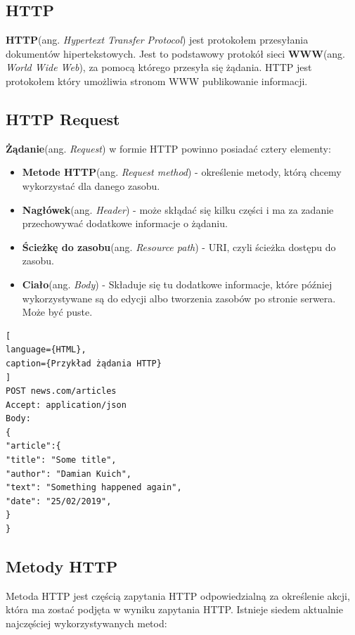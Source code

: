 \documentclass[oneside,polski,logo,indent]{amuthesis}
\begin{document}
\begin{center}
\subsection{HTTP}
\end{center}

\textbf{HTTP}(ang. \emph{Hypertext Transfer Protocol}) jest protokołem przesyłania dokumentów hipertekstowych. Jest to podstawowy protokół sieci \textbf{WWW}(ang. \emph{World Wide Web}), za pomocą którego przesyła się żądania. HTTP jest protokołem który umożliwia stronom WWW publikowanie informacji.

\begin{center}
\subsection{HTTP Request}
\end{center}
\textbf{Żądanie}(ang. \emph{Request}) w formie HTTP powinno posiadać cztery elementy:
\begin{itemize}
\item \textbf{Metode HTTP}(ang. \emph{Request method}) - określenie metody, którą chcemy wykorzystać dla danego zasobu.
\item \textbf{Nagłówek}(ang. \emph{Header}) - może skłądać się kilku części i ma za zadanie przechowywać dodatkowe informacje o żądaniu.
\item \textbf{Ścieżkę do zasobu}(ang. \emph{Resource path}) - URI, czyli ścieżka dostępu do zasobu.
\item \textbf{Ciało}(ang. \emph{Body}) - Składuje się tu dodatkowe informacje, które później wykorzystywane są do edycji albo tworzenia zasobów po stronie serwera. Może być puste.
\end{itemize}


\begin{lstlisting}[
language={HTML},
caption={Przykład żądania HTTP}
]
POST news.com/articles
Accept: application/json
Body:
{
"article":{
"title": "Some title",
"author": "Damian Kuich",
"text": "Something happened again",
"date": "25/02/2019",
}
}
\end{lstlisting}

\begin{center}
\subsection{Metody HTTP}
\end{center}
Metoda HTTP jest częścią zapytania HTTP odpowiedzialną za określenie akcji, która ma zostać podjęta w wyniku zapytania HTTP. Istnieje siedem aktualnie najczęściej wykorzystywanych metod:
\end{document}
